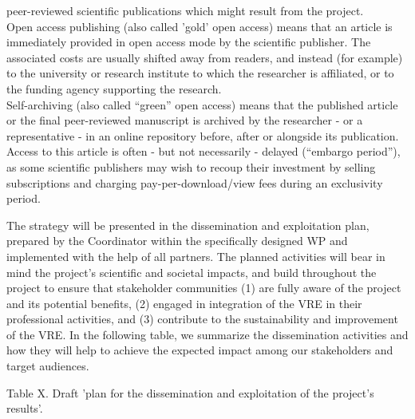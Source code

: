 {peer-reviewed scientific publications which might result from the project.\\
Open access publishing (also called 'gold' open access) means that an article is
immediately provided in open access mode by the scientific publisher. The associated costs
are usually shifted away from readers, and instead (for example) to the university or
research institute to which the researcher is affiliated, or to the funding agency supporting
the research.\\
Self-archiving (also called ``green'' open access) means that the published article or the
final peer-reviewed manuscript is archived by the researcher - or a representative - in an
online repository before, after or alongside its publication. Access to this article is often -
but not necessarily - delayed (``embargo period''), as some scientific publishers may wish to
recoup their investment by selling subscriptions and charging pay-per-download/view fees
during an exclusivity period.}


The strategy will be presented in the dissemination and exploitation plan, prepared by the Coordinator within the specifically designed WP and implemented with the help of all partners. The planned activities will bear in mind the project's scientific and societal impacts, and build throughout the project to ensure that stakeholder communities (1) are fully aware of the project and its potential benefits, (2) engaged in integration of the VRE in their professional activities, and (3) contribute to the sustainability and improvement of the VRE. In the following table, we summarize the dissemination activities and how they will help to achieve the expected impact among our stakeholders and target audiences. 


Table X.  Draft 'plan for the dissemination and exploitation of the
project's results'.

